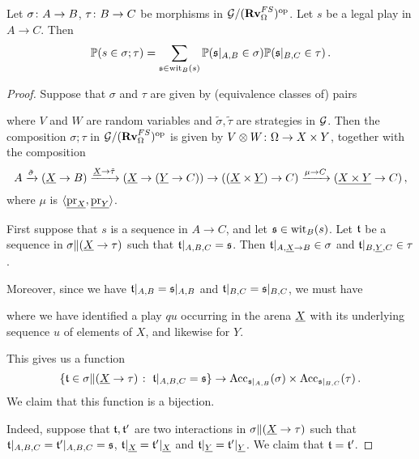 \documentclass{report}[11pt]
\begin{document}
\begin{proposition}
  Let $\sigma\colon A \to B$, $\tau\colon B \to C$ be morphisms in $\mathcal G/({\normalfont\textbf{Rv}}_{\Omega}^{FS})^{\mathrm{op}}$.  
  Let $s$ be a legal play in $A \to C$.
  Then
  \[
    \mathbb{P}(s\in\sigma;\tau) = \sum_{\mathfrak s\in\operatorname{wit}_B(s)}\mathbb{P}(\mathfrak s\vert_{A,B}\in\sigma)\mathbb{P}(\mathfrak s\vert_{B,C}\in\tau)\,.
    \]
\end{proposition}
\begin{proof}
  Suppose that $\sigma$ and $\tau$ are given by (equivalence classes of) pairs
  where $V$ and $W$ are random variables and $\tilde \sigma,\tilde\tau$ are strategies in $\mathcal G$.
  Then the composition $\sigma;\tau$ in $\mathcal G/({\normalfont\textbf{Rv}}_{\Omega}^{FS})^{\mathrm{op}}$ is given by $V\otimes W\colon\Omega \to X\times Y$, together with the \Mellies composition
  \[
    A \xrightarrow{\tilde\sigma}
    ({\underline{X}} \to B) \xrightarrow{{\underline{X}} \to \tilde\tau}
    ({\underline{X}} \to ({\underline{Y}} \to C)) \to
    (({\underline{X}} \times {\underline{Y}}) \to C) \xrightarrow{\mu\to C}
    ({\underline{X\times Y}} \to C)\,,
    \]
  where $\mu$ is $\langle{\underline{\operatorname{pr}_X}},{\underline{\operatorname{pr}_Y}}\rangle$.

  First suppose that $s$ is a sequence in $A \to C$, and let $\mathfrak s\in\operatorname{wit}_B(s)$.  
  Let $\mathfrak t$ be a sequence in $\sigma\|({\underline{X}} \to \tau)$ such that $\mathfrak t\vert_{A,B,C}=\mathfrak s$.  
  Then $\mathfrak t\vert_{A,{\underline{X}} \to B}\in\sigma$ and $\mathfrak t\vert_{B,{\underline{Y}},C}\in\tau$.

  Moreover, since we have $\mathfrak t\vert_{A,B}=\mathfrak s\vert_{A,B}$ and $\mathfrak t\vert_{B,C}=\mathfrak s\vert_{B,C}$, we must have
  where we have identified a play $qu$ occurring in the arena ${\underline{X}}$ with its underlying sequence $u$ of elements of $X$, and likewise for $Y$.

  This gives us a function
  \[
    \{\mathfrak t\in\sigma\|({\underline{X}} \to \tau)\;\colon\; \mathfrak t\vert_{A,B,C}=\mathfrak s\} \to \operatorname{Acc}_{\mathfrak s\vert_{A,B}}(\sigma)\times\operatorname{Acc}_{\mathfrak s\vert_{B,C}}(\tau)\,.
    \]
  We claim that this function is a bijection.

  Indeed, suppose that $\mathfrak t,\mathfrak t'$ are two interactions in $\sigma\|({\underline{X}} \to \tau)$ such that $\mathfrak t\vert_{A,B,C}=\mathfrak t'\vert_{A,B,C}=\mathfrak s$, $\mathfrak t\vert_{{\underline{X}}} = \mathfrak t'\vert_{{\underline{X}}}$ and $\mathfrak t\vert_{{\underline{Y}}}=\mathfrak t'\vert_{{\underline{Y}}}$.
  We claim that $\mathfrak t = \mathfrak t'$.


\end{proof}
\end{document}
